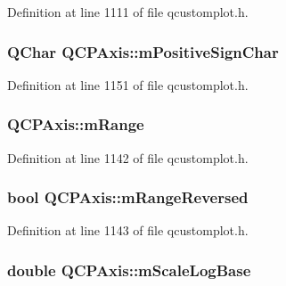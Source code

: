 Definition at line 1111 of file qcustomplot.\-h.

\hypertarget{class_q_c_p_axis_ae99d47103ec8ba66959205b23991241b}{
\subsubsection[{m\-Positive\-Sign\-Char}]{\setlength{\rightskip}{0pt plus 5cm}Q\-Char Q\-C\-P\-Axis\-::m\-Positive\-Sign\-Char\hspace{0.3cm}{\ttfamily [protected]}}}\label{class_q_c_p_axis_ae99d47103ec8ba66959205b23991241b}


Definition at line 1151 of file qcustomplot.\-h.

\hypertarget{class_q_c_p_axis_a1ee36773c49062d751560e11f90845f7}{
\subsubsection[{m\-Range}]{ Q\-C\-P\-Axis\-::m\-Range\hspace{0.3cm}{\ttfamily [protected]}}}\label{class_q_c_p_axis_a1ee36773c49062d751560e11f90845f7}


Definition at line 1142 of file qcustomplot.\-h.

\hypertarget{class_q_c_p_axis_a5cb034f57aa3d773a9ca55a0931dbf7b}{
\subsubsection[{m\-Range\-Reversed}]{\setlength{\rightskip}{0pt plus 5cm}bool Q\-C\-P\-Axis\-::m\-Range\-Reversed\hspace{0.3cm}{\ttfamily [protected]}}}\label{class_q_c_p_axis_a5cb034f57aa3d773a9ca55a0931dbf7b}


Definition at line 1143 of file qcustomplot.\-h.

\hypertarget{class_q_c_p_axis_abc727ddb4af745151755d1b5e60d03c3}{
\subsubsection[{m\-Scale\-Log\-Base}]{\setlength{\rightskip}{0pt plus 5cm}double Q\-C\-P\-Axis\-::m\-Scale\-Log\-Base\hspace{0.3cm}{\ttfamily [protected]}}}\label{class_q_c_p_axis_abc727ddb4af745151755d1b5e60d03c3}


